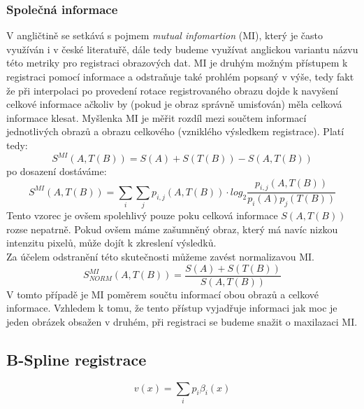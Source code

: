 \documentclass{thesis}%
\begin{document}
\subsubsection{Společná informace}
V angličtině se setkává s pojmem \textit{mutual infomartion} (MI), který je často využíván i v české literatuřě, dále tedy budeme využívat anglickou variantu názvu této metriky pro registraci obrazových dat. MI je druhým možným přístupem k registraci pomocí informace a odstraňuje také prohlém popsaný v výše, tedy fakt že při interpolaci po provedení rotace registrovaného obrazu dojde k navyšení celkové informace ačkoliv by (pokud je obraz správně umisťován) měla celková informace klesat. Myšlenka MI je měřit rozdíl mezi součtem informací jednotlivých obrazů a obrazu celkového (vzniklého výsledkem registrace). Platí tedy:
\begin{equation}
S^{MI}(A, T(B)) = S(A) + S(T(B)) - S(A,T(B))
\end{equation}
po dosazení dostáváme:
\begin{equation}
S^{MI}(A, T(B)) = \sum\limits_i \sum\limits_j p_{i,j} (A,T(B))\cdot log_2 \frac{p_{i,j} (A,T(B))}{p_i(A)p_j(T(B))}
\end{equation}
Tento vzorec je ovšem spolehlivý pouze poku celková informace $S(A,T(B))$ rozse nepatrně. Pokud ovšem máme zašumněný obraz, který má navíc nizkou intenzitu pixelů, může dojít k zkreslení výsledků.\\Za účelem odstranění této skutečnosti můžeme zavést normalizavou MI.
\begin{equation}
S_{NORM}^{MI}(A, T(B)) =\frac{S(A)+S(T(B))}{S (A,T(B))}
\end{equation}
V tomto případě je MI poměrem součtu informací obou obrazů a celkové informace. Vzhledem k tomu, že tento přístup vyjadřuje informaci jak moc je jeden obrázek obsažen v druhém, při registraci se budeme snažit o maxilazaci MI.

\subsection{B-Spline registrace}

\begin{equation}
v(x)=\sum_i p_i \beta_i(x)
\end{equation}
\end{document}
